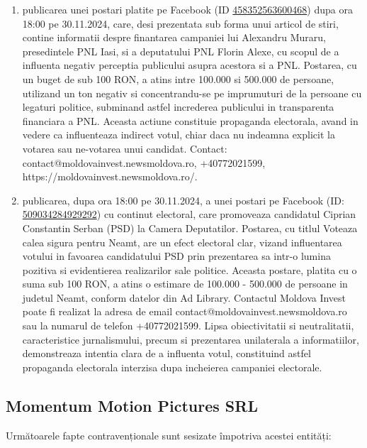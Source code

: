 \documentclass[a4paper,12pt]{article}
\begin{document}
\begin{enumerate}[leftmargin=*, label=\arabic*.)]
    \item publicarea unei postari platite pe Facebook (ID \href{https://www.facebook.com/ads/library/?id=458352563600468}{458352563600468}) dupa ora 18:00 pe 30.11.2024, care, desi prezentata sub forma unui articol de stiri, contine informatii despre finantarea campaniei lui Alexandru Muraru, presedintele PNL Iasi, si a deputatului PNL Florin Alexe, cu scopul de a influenta negativ perceptia publicului asupra acestora si a PNL.  Postarea, cu un buget de sub 100 RON, a atins intre 100.000 si 500.000 de persoane, utilizand un ton negativ si concentrandu-se pe imprumuturi de la persoane cu legaturi politice, subminand astfel increderea publicului in transparenta financiara a PNL.  Aceasta actiune constituie propaganda electorala, avand in vedere ca influenteaza indirect votul, chiar daca nu indeamna explicit la votarea sau ne-votarea unui candidat.  Contact: contact@moldovainvest.newsmoldova.ro, +40772021599, https://moldovainvest.newsmoldova.ro/.
    \item publicarea, dupa ora 18:00 pe 30.11.2024, a unei postari pe Facebook (ID: \href{https://www.facebook.com/ads/library/?id=509034284929292}{509034284929292}) cu continut electoral, care promoveaza candidatul Ciprian Constantin Serban (PSD) la Camera Deputatilor. Postarea, cu titlul Voteaza calea sigura pentru Neamt, are un efect electoral clar, vizand influentarea votului in favoarea candidatului PSD prin prezentarea sa intr-o lumina pozitiva si evidentierea realizarilor sale politice.  Aceasta postare, platita cu o suma sub 100 RON, a atins o estimare de 100.000 - 500.000 de persoane in judetul Neamt, conform datelor din Ad Library.  Contactul Moldova Invest poate fi realizat la adresa de email contact@moldovainvest.newsmoldova.ro sau la numarul de telefon +40772021599.  Lipsa obiectivitatii si neutralitatii, caracteristice jurnalismului, precum si prezentarea unilaterala a informatiilor, demonstreaza intentia clara de a influenta votul, constituind astfel propaganda electorala interzisa dupa incheierea campaniei electorale.
\end{enumerate}

\vspace{0.5cm}

\subsection{Momentum Motion Pictures SRL}
Următoarele fapte contravenționale sunt sesizate împotriva acestei entități:
\end{document}
